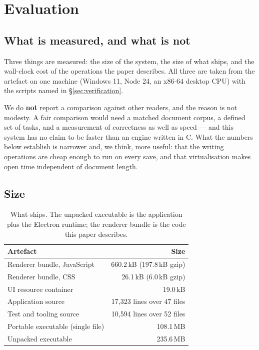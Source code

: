 \section{Evaluation}
\label{sec:eval}

\subsection{What is measured, and what is not}

Three things are measured: the size of the system, the size of what ships, and the wall-clock
cost of the operations the paper describes. All three are taken from the artefact on one
machine (Windows 11, Node 24, an x86-64 desktop CPU) with the scripts named in
\S\ref{sec:verification}.

We do \textbf{not} report a comparison against other readers, and the reason is not modesty.
A fair comparison would need a matched document corpus, a defined set of tasks, and a
measurement of correctness as well as speed --- and this system has no claim to be faster than
an engine written in C. What the numbers below establish is narrower and, we think, more
useful: that the writing operations are cheap enough to run on every save, and that
virtualisation makes open time independent of document length.

\subsection{Size}

\begin{table}[t]
  \centering
  \caption{What ships. The unpacked executable is the application plus the Electron runtime;
  the renderer bundle is the code this paper describes.}
  \label{tab:sizes}
  \small
  \begin{tabular}{@{}lr@{}}
    \toprule
    Artefact & Size \\
    \midrule
    Renderer bundle, JavaScript & 660.2\,kB (197.8\,kB gzip) \\
    Renderer bundle, CSS & 26.1\,kB (6.0\,kB gzip) \\
    UI resource container & 19.0\,kB \\
    Application source & 17{,}323 lines over 47 files \\
    Test and tooling source & 10{,}594 lines over 52 files \\
    \midrule
    Portable executable (single file) & 108.1\,MB \\
    Unpacked executable & 235.6\,MB \\
    \bottomrule
  \end{tabular}
\end{table}

